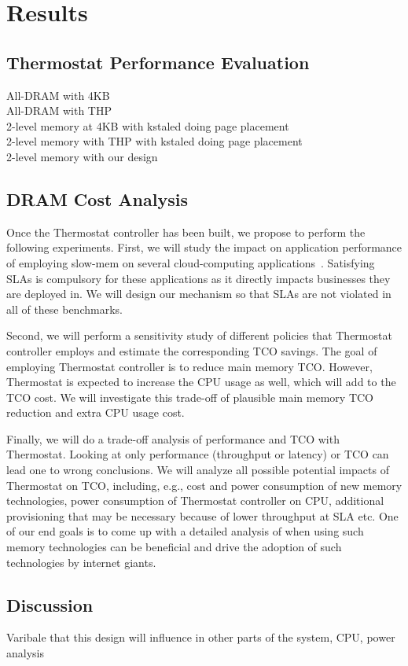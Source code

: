 \section{Results}
\label{results}

\subsection{Thermostat Performance Evaluation}
All-DRAM with 4KB\\
All-DRAM with THP\\
2-level memory at 4KB with kstaled doing page placement\\
2-level memory with THP with kstaled doing page placement\\ 
2-level memory with our design\\

\subsection{DRAM Cost Analysis}

Once the Thermostat controller has been built, we propose to perform the
following experiments. First, we will study the impact on application
performance of employing slow-mem on several cloud-computing
applications~\cite{Perfkitbenchmarker}. Satisfying SLAs is compulsory for these
applications as it directly impacts businesses they are deployed in. We will
design our mechanism so that SLAs are not violated in all of these benchmarks.

Second, we will perform a sensitivity study of different policies that Thermostat
controller employs and estimate the corresponding TCO savings. The goal of
employing Thermostat controller is to reduce main memory TCO. However, Thermostat is
expected to increase the CPU usage as well, which will add to the TCO cost. We
will investigate this trade-off of plausible main memory TCO reduction and extra
CPU usage cost.

Finally, we will do a trade-off analysis of performance and TCO with Thermostat.
Looking at only performance (throughput or latency) or TCO can lead one to wrong
conclusions. We will analyze all possible potential impacts of Thermostat on TCO,
including, e.g., cost and power consumption of new memory technologies, power
consumption of Thermostat controller on CPU, additional provisioning that may be
necessary because of lower throughput at SLA etc. One of our end goals is
to come up with a detailed analysis of when using such memory technologies can
be beneficial and drive the adoption of such technologies by internet giants.

\subsection{Discussion}
Varibale that this design will influence in other parts of the system, CPU,
power analysis

